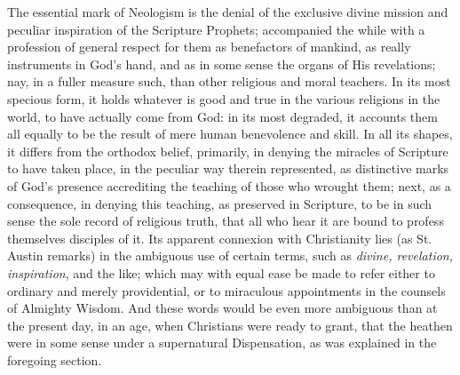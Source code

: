 The essential mark of Neologism is the denial of the exclusive
divine mission and peculiar inspiration of the Scripture Prophets;
accompanied the while with a profession of general respect for them as
benefactors of mankind, as really instruments in God's hand, and as in
some sense the organs of His revelations; nay, in a fuller measure
such, than other religious and moral teachers. In its most specious
form, it holds whatever is good and true in the various
religions in the world, to have actually come from God: in its most
degraded, it accounts them all equally to be the result of mere human
benevolence and skill. In all its shapes, it differs from the orthodox
belief, primarily, in denying the miracles of Scripture to have taken
place, in the peculiar way therein represented, as distinctive marks
of God's presence accrediting the teaching of those who wrought them;
next, as a consequence, in denying this teaching, as preserved in
Scripture, to be in such sense the sole record of religious truth,
that all who hear it are bound to profess themselves disciples of it.
Its apparent connexion with Christianity lies (as St. Austin remarks)
in the ambiguous use of certain terms, such as \emph{divine, revelation,
inspiration}, and the like; which may with equal ease be made to
refer either to ordinary and merely providential, or to miraculous
appointments in the counsels of Almighty Wisdom. And these words would
be even more ambiguous than at the present day, in an age, when
Christians were ready to grant, that the heathen were in some sense
under a supernatural Dispensation, as was explained in the foregoing
section.

